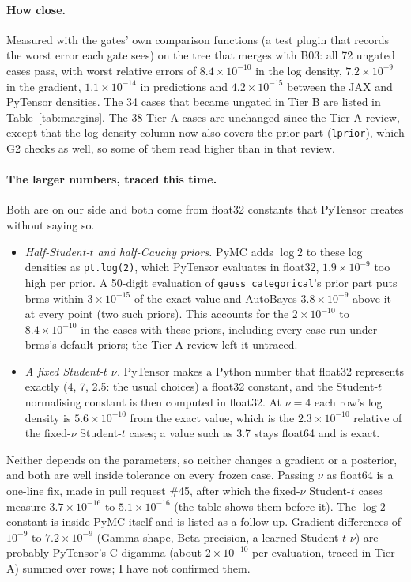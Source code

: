 \documentclass[11pt]{article}
\newcommand{\code}[1]{\texttt{#1}}
\begin{document}
\paragraph{How close.} Measured with the gates' own comparison functions (a test plugin that records the worst error each gate sees) on
the tree that merges with B03: all 72 ungated cases pass, with worst relative errors of $8.4\times10^{-10}$ in the log
density, $7.2\times10^{-9}$ in the gradient, $1.1\times10^{-14}$ in predictions and $4.2\times10^{-15}$ between the
JAX and PyTensor densities. The 34 cases that became ungated in Tier B are listed in Table~\ref{tab:margins}. The 38 Tier A cases are
unchanged since the Tier A review, except that the log-density column now also covers the prior part
(\code{lprior}), which G2 checks as well, so some of them read higher than in that review.

\paragraph{The larger numbers, traced this time.} Both are on our side and both come from float32 constants that
PyTensor creates without saying so.
\begin{itemize}
\item \emph{Half-Student-$t$ and half-Cauchy priors.} PyMC adds $\log 2$ to these log densities as \code{pt.log(2)},
  which PyTensor evaluates in float32, $1.9\times10^{-9}$ too high per prior. A 50-digit evaluation of
  \code{gauss\_categorical}'s prior part puts brms within $3\times10^{-15}$ of the exact value and AutoBayes
  $3.8\times10^{-9}$ above it at every point (two such priors). This accounts for the $2\times10^{-10}$ to
  $8.4\times10^{-10}$ in the cases with these priors, including every case run under brms's default priors; the Tier A
  review left it untraced.
\item \emph{A fixed Student-$t$ $\nu$.} PyTensor makes a Python number that float32 represents exactly (4, 7, 2.5:
  the usual choices) a float32 constant, and the Student-$t$ normalising constant is then computed in float32. At
  $\nu = 4$ each row's log density is $5.6\times10^{-10}$ from the exact value, which is the $2.3\times10^{-10}$
  relative of the fixed-$\nu$ Student-$t$ cases; a value such as 3.7 stays float64 and is exact.
\end{itemize}
\noindent Neither depends on the parameters, so neither changes a gradient or a posterior, and both are well inside
tolerance on every frozen case. Passing $\nu$ as float64 is a one-line fix, made in pull request \#45, after which the
fixed-$\nu$ Student-$t$ cases measure $3.7\times10^{-16}$ to $5.1\times10^{-16}$ (the table shows them before it). The $\log 2$ constant is inside PyMC itself and is listed as a follow-up. Gradient differences of
$10^{-9}$ to $7.2\times10^{-9}$ (Gamma shape, Beta precision, a learned Student-$t$ $\nu$) are probably PyTensor's C
digamma (about $2\times10^{-10}$ per evaluation, traced in Tier A) summed over rows; I have not confirmed them.
\end{document}
